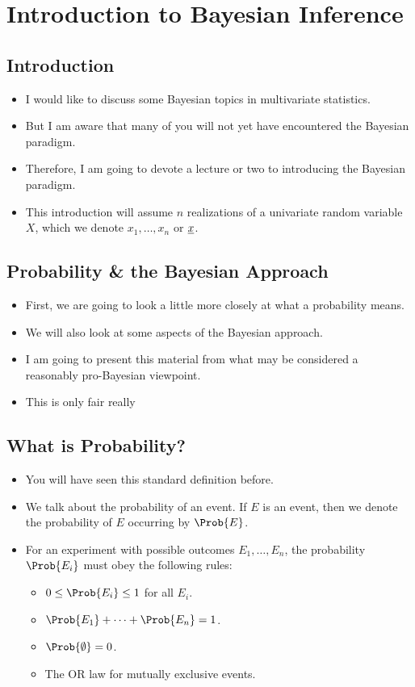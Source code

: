 \section{Introduction to Bayesian Inference}
\subsection*{Introduction}
\begin{itemize}
      \item I would like to discuss some Bayesian topics in multivariate statistics.
      \item But I am aware that many of you will not yet have encountered the
            Bayesian paradigm.
      \item Therefore, I am going to devote a lecture or two to introducing the
            Bayesian paradigm.
      \item This introduction will assume $n$ realizations of a univariate random
            variable $ X $, which we denote $ x_1,\ldots,x_n $ or $ \underline{x} $.
\end{itemize}
\subsection*{Probability \& the Bayesian Approach}
\begin{itemize}
      \item First, we are going to look a little more closely at what a probability
            means.
      \item We will also look at some aspects of the Bayesian approach.
      \item I am going to present this material from what may be considered a
            reasonably pro-Bayesian viewpoint.
      \item This is only fair really\textellipsis{}
\end{itemize}
\subsection*{What is Probability?}
\begin{itemize}
      \item You will have seen this standard definition before.
      \item We talk about the probability of an event. If $ E $ is an event, then we denote the probability of $ E $
            occurring by $ \Prob{E} $.
      \item For an experiment with possible outcomes $ E_1,\ldots,E_n $, the probability $ \Prob{E_i} $ must obey the following rules:
            \begin{itemize}
                  \item $ 0\le \Prob{E_i}\le 1 $ for all $ E_i $.
                  \item $ \Prob{E_1}+\cdots+\Prob{E_n}=1 $.
                  \item $ \Prob{\emptyset}=0 $.
                  \item The OR law for mutually exclusive events.
            \end{itemize}
\end{itemize}
